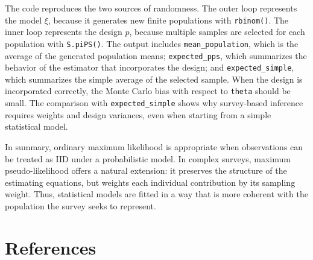 \documentclass[
  english,
  12pt,
]{book}
\begin{document}
The code reproduces the two sources of randomness. The outer loop represents the model \(\xi\), because it generates new finite populations with \texttt{rbinom()}. The inner loop represents the design \(p\), because multiple samples are selected for each population with \texttt{S.piPS()}. The output includes \texttt{mean\_population}, which is the average of the generated population means; \texttt{expected\_pps}, which summarizes the behavior of the estimator that incorporates the design; and \texttt{expected\_simple}, which summarizes the simple average of the selected sample. When the design is incorporated correctly, the Monte Carlo bias with respect to \texttt{theta} should be small. The comparison with \texttt{expected\_simple} shows why survey-based inference requires weights and design variances, even when starting from a simple statistical model.

In summary, ordinary maximum likelihood is appropriate when observations can be treated as IID under a probabilistic model. In complex surveys, maximum pseudo-likelihood offers a natural extension: it preserves the structure of the estimating equations, but weights each individual contribution by its sampling weight. Thus, statistical models are fitted in a way that is more coherent with the population the survey seeks to represent.

\chapter*{References}\label{referencias}


\end{document}
